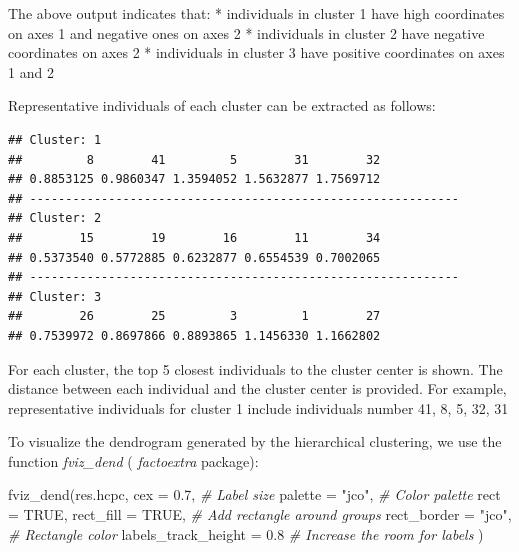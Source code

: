 \documentclass[
]{article}
\newenvironment{Shaded}{\begin{snugshade}}{\end{snugshade}}
\newcommand{\AttributeTok}[1]{\textcolor[rgb]{0.77,0.63,0.00}{#1}}
\newcommand{\CommentTok}[1]{\textcolor[rgb]{0.56,0.35,0.01}{\textit{#1}}}
\newcommand{\ConstantTok}[1]{\textcolor[rgb]{0.00,0.00,0.00}{#1}}
\newcommand{\FloatTok}[1]{\textcolor[rgb]{0.00,0.00,0.81}{#1}}
\newcommand{\FunctionTok}[1]{\textcolor[rgb]{0.00,0.00,0.00}{#1}}
\newcommand{\NormalTok}[1]{#1}
\newcommand{\SpecialCharTok}[1]{\textcolor[rgb]{0.00,0.00,0.00}{#1}}
\newcommand{\StringTok}[1]{\textcolor[rgb]{0.31,0.60,0.02}{#1}}
\begin{document}
The above output indicates that: * individuals in cluster 1 have high
coordinates on axes 1 and negative ones on axes 2 * individuals in
cluster 2 have negative coordinates on axes 2 * individuals in cluster 3
have positive coordinates on axes 1 and 2

Representative individuals of each cluster can be extracted as follows:

\begin{Shaded}
\end{Shaded}

\begin{verbatim}
## Cluster: 1
##         8        41         5        31        32 
## 0.8853125 0.9860347 1.3594052 1.5632877 1.7569712 
## ------------------------------------------------------------ 
## Cluster: 2
##        15        19        16        11        34 
## 0.5373540 0.5772885 0.6232877 0.6554539 0.7002065 
## ------------------------------------------------------------ 
## Cluster: 3
##        26        25         3         1        27 
## 0.7539972 0.8697866 0.8893865 1.1456330 1.1662802
\end{verbatim}

For each cluster, the top 5 closest individuals to the cluster center is
shown. The distance between each individual and the cluster center is
provided. For example, representative individuals for cluster 1 include
individuals number 41, 8, 5, 32, 31

To visualize the dendrogram generated by the hierarchical clustering, we
use the function \emph{fviz\_dend} ( \emph{factoextra} package):

\begin{Shaded}
\begin{Highlighting}[]
\FunctionTok{fviz\_dend}\NormalTok{(res.hcpc, }
          \AttributeTok{cex =} \FloatTok{0.7}\NormalTok{,            }\CommentTok{\# Label size}
          \AttributeTok{palette =} \StringTok{"jco"}\NormalTok{,      }\CommentTok{\# Color palette }
          \AttributeTok{rect =} \ConstantTok{TRUE}\NormalTok{, }
          \AttributeTok{rect\_fill =} \ConstantTok{TRUE}\NormalTok{, }\CommentTok{\# Add rectangle around groups}
          \AttributeTok{rect\_border =} \StringTok{"jco"}\NormalTok{,           }\CommentTok{\# Rectangle color}
          \AttributeTok{labels\_track\_height =} \FloatTok{0.8}   \CommentTok{\# Increase the room for labels}
\NormalTok{          )}
\end{Highlighting}
\end{Shaded}
\end{document}
